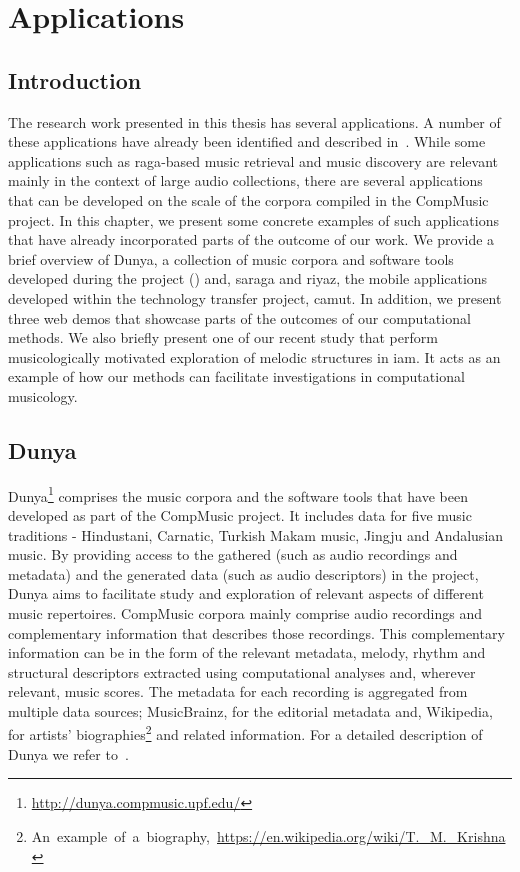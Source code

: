 
\chapter{Applications}
\label{chap:applicatoins}

\section{Introduction}
\label{sec:applications_introduction}

The research work presented in this thesis has several applications. A number of these applications have already been identified and described in~. While some applications such as \gls{raga}-based music retrieval and music discovery are relevant mainly in the context of large audio collections, there are several applications that can be developed on the scale of the corpora compiled in the CompMusic project. In this chapter, we present some concrete examples of such applications that have already incorporated parts of the outcome of our work. We provide a brief overview of Dunya, a collection of music corpora and software tools developed during the project () and, \Gls{saraga} and \Gls{riyaz}, the mobile applications developed within the technology transfer project, \gls{camut}. In addition, we present three web demos that showcase parts of the outcomes of our computational methods. We also briefly present one of our recent study that perform musicologically motivated exploration of melodic structures in \gls{iam}. It acts as an example of how our methods can facilitate investigations in computational musicology.

\section{Dunya}
\label{sec:applications_dunya}

Dunya\footnote{\url{http://dunya.compmusic.upf.edu/}} comprises the music corpora and the software tools that have been developed as part of the CompMusic project. It includes data for five music traditions - Hindustani, Carnatic, Turkish Makam music, Jingju and Andalusian music. By providing access to the gathered (such as audio recordings and metadata) and the generated data (such as audio descriptors) in the project, Dunya aims to facilitate study and exploration of relevant aspects of different music repertoires. CompMusic corpora mainly comprise audio recordings and complementary information that describes those recordings. This complementary information can be in the form of the relevant metadata, melody, rhythm and structural descriptors extracted using computational analyses and, wherever relevant, music scores. The metadata for each recording is aggregated from multiple data sources; MusicBrainz, for the editorial metadata and, Wikipedia, for artists' biographies\footnote{An~example~of~a~biography,~\url{https://en.wikipedia.org/wiki/T._M._Krishna}} and related information. For a detailed description of Dunya we refer to~\cite{dunya_porter}.

